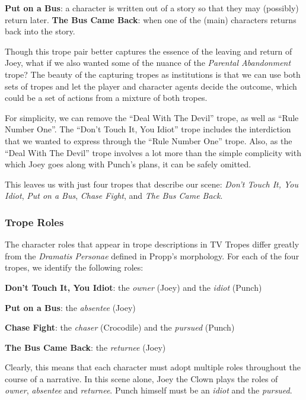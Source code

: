 \textbf{Put on a Bus}: a character is written out of a story so that they may
(possibly) return later.
\textbf{The Bus Came Back}: when one of the (main) characters returns back into
the story.

Though this trope pair better captures the essence of the leaving and return of
Joey, what if we also wanted some of the nuance of the \emph{Parental
  Abandonment} trope? The beauty of the capturing tropes as institutions is that
we can use both sets of tropes and let the player and character agents decide
the outcome, which could be a set of actions from a mixture of both tropes.

For simplicity, we can remove the ``Deal With The Devil'' trope, as well as
``Rule Number One''. The ``Don't Touch It, You Idiot'' trope includes the
interdiction that we wanted to express through the ``Rule Number One'' trope.
Also, as the ``Deal With The Devil'' trope involves a lot more than the simple
complicity with which Joey goes along with Punch's plans, it can be safely omitted.

This leaves us with just four tropes that describe our scene: \emph{Don't Touch
  It, You Idiot}, \emph{Put on a Bus}, \emph{Chase Fight}, and \emph{The Bus Came Back}.

\subsubsection{Trope Roles}
The character roles that appear in trope descriptions in TV Tropes differ
greatly from the \emph{Dramatis Personae} defined in Propp's morphology. For
each of the four tropes, we identify the following roles:

\begin{compactitem}
\item \textbf{Don't Touch It, You Idiot}: the \emph{owner} (Joey) and the \emph{idiot} (Punch)
\item \textbf{Put on a Bus}: the \emph{absentee} (Joey)
\item \textbf{Chase Fight}: the \emph{chaser} (Crocodile) and the \emph{pursued} (Punch)
\item \textbf{The Bus Came Back}: the \emph{returnee} (Joey)
\end{compactitem}

Clearly, this means that each character must adopt multiple roles throughout the
course of a narrative. In this scene alone, Joey the Clown plays the roles of
\emph{owner}, \emph{absentee} and \emph{returnee}. Punch himself must be an
\emph{idiot} and the \emph{pursued}.


